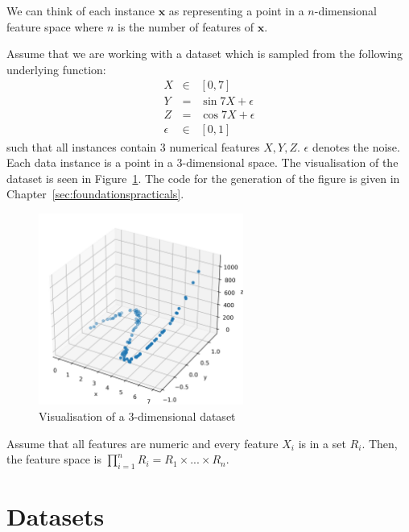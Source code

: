 We can think of each instance $\textbf{x}$ as representing a point in a $n$-dimensional feature space where $n$ is the number of features of $\textbf{x}$. 

\begin{example}\label{example:3dscatter}
Assume that we are working with a dataset which is sampled from the following underlying function: 
\begin{equation}
\begin{array}{rcl}
    X & \in & [0,7] \\
    Y & = & \sin{7X} + \epsilon \\
    Z & = & \cos{7X} + \epsilon \\
    \epsilon & \in & [0,1] 
\end{array}
\end{equation}
such that all instances contain 3 numerical features $X,Y,Z$. $\epsilon$ denotes the noise.  Each data instance  is a point in a 3-dimensional space. The visualisation of the dataset is seen in Figure~\ref{fig:3dscatter}. The code for the generation of the figure is given in Chapter~\ref{sec:foundationspracticals}. 

\begin{figure}[!htbp]
    \centering
    \includegraphics[width=0.6\textwidth]{images/foundations/3d_scatter.png}
    \caption{Visualisation of a 3-dimensional dataset}
    \label{fig:3dscatter}
\end{figure}
\end{example}

Assume that all features are numeric and every feature $X_i$ is in a set $R_i$. Then, the feature space is $\displaystyle \prod_{i=1}^n R_i = R_1\times ... \times R_n$.

\section{Datasets}\label{sec:datasets}

